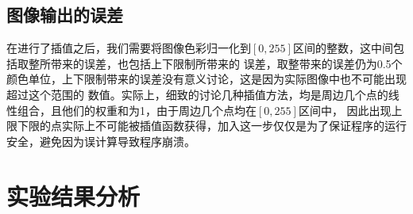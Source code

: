 \documentclass[UTF8,a4paper]{paper}
\begin{document}
\subsection{图像输出的误差}
在进行了插值之后，我们需要将图像色彩归一化到$[0,255]$区间的整数，这中间包括取整所带来的误差，也包括上下限制所带来的
误差，取整带来的误差仍为0.5个颜色单位，上下限制带来的误差没有意义讨论，这是因为实际图像中也不可能出现超过这个范围的
数值。实际上，细致的讨论几种插值方法，均是周边几个点的线性组合，且他们的权重和为1，由于周边几个点均在$[0,255]$区间中，
因此出现上限下限的点实际上不可能被插值函数获得，加入这一步仅仅是为了保证程序的运行安全，避免因为误计算导致程序崩溃。
\section{实验结果分析}
\end{document}
